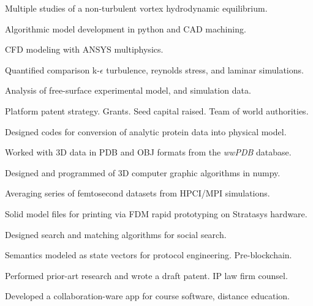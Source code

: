 \documentclass[letterpaper]{deedy-resume} %
\begin{document}
\begin{minipage}[t]{0.66\textwidth}

\vspace{\topsep} %
Multiple studies of a non-turbulent vortex hydrodynamic equilibrium.
\begin{tightitemize}
\item Algorithmic model development in python and CAD machining.
\item CFD modeling with ANSYS multiphysics.
\item Quantified comparison k-$\epsilon$ turbulence, reynolds stress, and laminar simulations.
\item Analysis of free-surface experimental model, and simulation data.
\item Platform patent strategy.  Grants. Seed capital raised. Team of world authorities.
\end{tightitemize}

\sectionspace %



\begin{tightitemize}
\item Designed codes for conversion of analytic protein data into physical model.
\item Worked with 3D data in PDB and OBJ formats from the \textit{wwPDB} database.
\item Designed and programmed of 3D computer graphic algorithms in numpy.
\item Averaging series of femtosecond datasets from HPCI/MPI simulations.
\item Solid model files for printing via FDM rapid prototyping on Stratasys hardware.
\end{tightitemize}

\sectionspace %





\begin{tightitemize}
\item Designed search and matching algorithms for social search.
\item Semantics modeled as state vectors for protocol engineering.  Pre-blockchain.
\item Performed prior-art research and wrote a draft patent. IP law firm counsel.
\item Developed a collaboration-ware app for course software, distance education.
\end{tightitemize}


\end{minipage}
\end{document}
